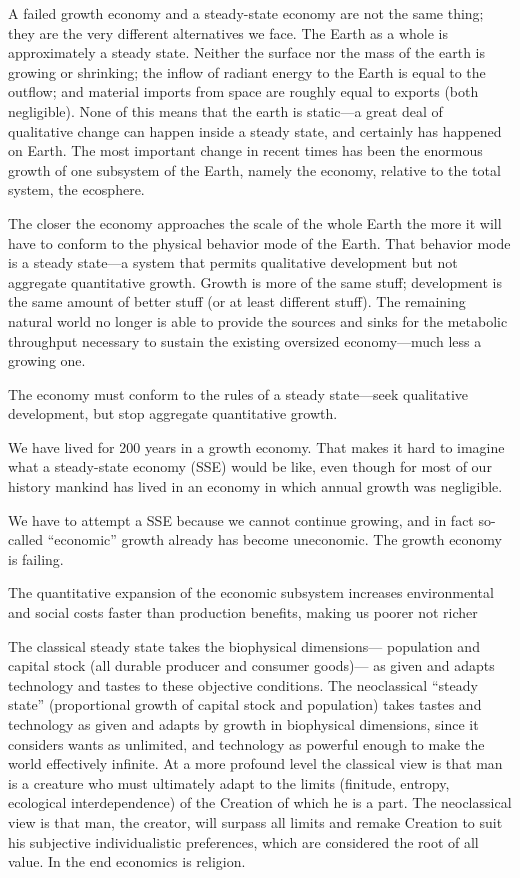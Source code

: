 \documentclass[
]{book}
\begin{document}
A failed growth economy and a steady-state economy are not the same thing; they are the very different alternatives
we face. The Earth as a whole is approximately a steady state. Neither the surface nor the mass of the earth is growing
or shrinking; the inflow of radiant energy to the Earth is equal to the outflow; and material imports from space are
roughly equal to exports (both negligible). None of this means that the earth is static---a great deal of qualitative
change can happen inside a steady state, and certainly has happened on Earth. The most important change in recent
times has been the enormous growth of one subsystem of the Earth, namely the economy, relative to the total system,
the ecosphere.

The closer the economy approaches the scale of the whole Earth the more it will have
to conform to the physical behavior mode of the Earth. That behavior mode is a steady state---a system that permits
qualitative development but not aggregate quantitative growth. Growth is more of the same stuff; development is the
same amount of better stuff (or at least different stuff). The remaining natural world no longer is able to provide the
sources and sinks for the metabolic throughput necessary to sustain the existing oversized economy---much less a
growing one.

The economy must conform to the rules of a steady
state---seek qualitative development, but stop aggregate quantitative growth.

We have lived for 200 years in a growth economy. That makes it hard to imagine what a steady-state economy (SSE)
would be like, even though for most of our history mankind has lived in an economy in which annual growth was
negligible.

We have to attempt a SSE because we cannot continue growing, and in
fact so-called ``economic'' growth already has become uneconomic. The growth economy is failing.

The quantitative expansion of the economic subsystem increases environmental and social costs faster than production
benefits, making us poorer not richer

The classical steady state takes the biophysical dimensions--- population and capital stock (all durable producer and
consumer goods)--- as given and adapts technology and tastes to these objective conditions. The neoclassical ``steady
state'' (proportional growth of capital stock and population) takes tastes and technology as given and adapts by growth
in biophysical dimensions, since it considers wants as unlimited, and technology as powerful enough to make the
world effectively infinite. At a more profound level the classical view is that man is a creature who must ultimately
adapt to the limits (finitude, entropy, ecological interdependence) of the Creation of which he is a part. The
neoclassical view is that man, the creator, will surpass all limits and remake Creation to suit his subjective
individualistic preferences, which are considered the root of all value. In the end economics is religion.
\end{document}
